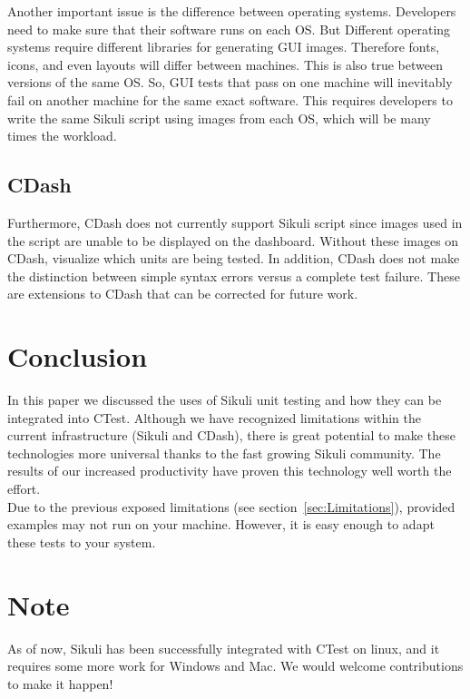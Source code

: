 \documentclass{InsightArticle}
\begin{document}
Another important issue is the difference between operating systems.
Developers need to make sure that their software runs on each OS. But
Different operating systems require different libraries for generating GUI
images. Therefore fonts, icons, and even layouts will differ between
machines. This is also true between versions of the same OS. So, GUI tests
that pass on one machine will inevitably fail on another machine for the
same exact software. This requires developers to write the same Sikuli 
script using images from each OS, which will be many times the workload.

\subsection{CDash}
Furthermore, CDash does not currently support Sikuli script since images used
in the script are unable to be displayed on the dashboard.  Without these
images on CDash, visualize which units are being tested.  In addition, CDash
does not make the distinction between simple syntax errors versus a complete
test failure. These are extensions to CDash that can be corrected for future
work.

\section{Conclusion}
\label{sec:Conclusion}
In this paper we discussed the uses of Sikuli unit testing and how they can be
integrated into CTest.  Although we have recognized limitations within the
current infrastructure (Sikuli and CDash), there is great potential to make
these technologies more universal thanks to the fast growing Sikuli
community. The results of our increased productivity have proven this
technology well worth the effort.\\

Due to the previous exposed limitations (see section~\ref{sec:Limitations}),
provided examples may not run on your machine. However, it is easy enough to
adapt these tests to your system.

\section*{Note}
As of now, Sikuli has been successfully integrated with CTest on
linux, and it
requires some more work for Windows and Mac. We would welcome
contributions to make it happen!


\clearpage



\end{document}

